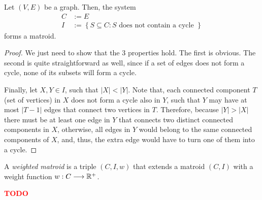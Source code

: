 \begin{lemma}
    Let $(V,E)$ be a graph. Then, the system
    \begin{align*}
	C &:= E \\
	I &:= \left\{ S \subseteq C : S \text{ does not contain a cycle }\right\} 
    \end{align*}
    forms a matroid.
\end{lemma}
\begin{proof}
    We just need to show that the 3 properties hold.
    The first is obvious.
    The second is quite straightforward as well, since if a set of edges does not form a cycle, none of its subsets will form a cycle.

    Finally, let $X,Y \in I$, such that $|X| < |Y|$.
    Note that, each connected component $T$ (set of vertices) in $X$ does not form a cycle also in $Y$, such that $Y$ may have at most  $|T-1|$ edges that connect two vertices in $T$.
    Therefore, because $|Y|>|X|$ there must be at least one edge in $Y$ that connects two distinct connected components in $X$, otherwise, all edges in $Y$ would belong to the same connected components of $X$, and, thus, the extra edge would have to turn one of them into a cycle.
\end{proof}

\begin{definition}
    A \emph{weighted matroid} is a triple $(C,I,w)$ that extends a matroid  $\left( C,I \right) $ with a weight function $w: C \longrightarrow \mathbb{R}^{+}$.
\end{definition}

\textcolor{red}{\textbf{TODO}}

